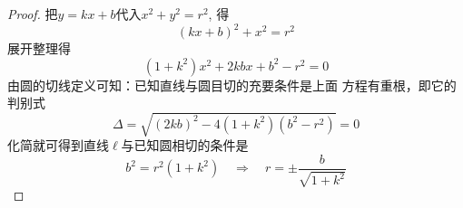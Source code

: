 \begin{proof}
    把$y=kx+b$代入$x^2+y^2=r^2$, 得
\[(kx+b)^2+x^2=r^2\]
展开整理得
\[(1+k^2)x^2+2kbx+b^2-r^2=0\]
由圆的切线定义可知：已知直线与圆目切的充要条件是上面
方程有重根，即它的判别式
\[\Delta=\sqrt{(2kb)^2-4(1+k^2)(b^2-r^2)}=0\]
化简就可得到直线$\ell$与已知圆相切的条件是
\[
    b^2=r^2(1+k^2)\quad \Rightarrow\quad   r=\pm\frac{b}{\sqrt{1+k^2}}
\]
\end{proof}





















